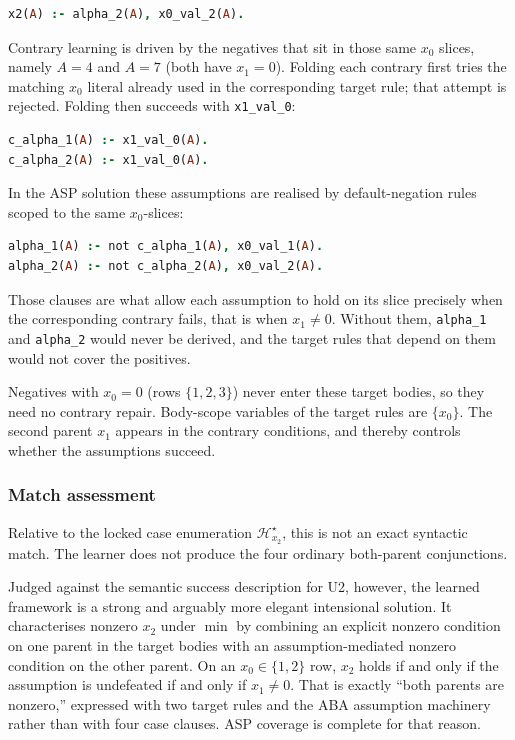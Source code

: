 \documentclass[11pt]{article}
\begin{document}
\begin{lstlisting}[style=logic,language=Prolog]
x2(A) :- alpha_2(A), x0_val_2(A).
\end{lstlisting}

Contrary learning is driven by the negatives that sit in those same \(x_0\) slices, namely \(A=4\) and \(A=7\) (both have \(x_1=0\)). Folding each contrary first tries the matching \(x_0\) literal already used in the corresponding target rule; that attempt is rejected. Folding then succeeds with \texttt{x1\_val\_0}:

\begin{lstlisting}[style=logic,language=Prolog]
c_alpha_1(A) :- x1_val_0(A).
c_alpha_2(A) :- x1_val_0(A).
\end{lstlisting}

In the ASP solution these assumptions are realised by default-negation rules scoped to the same \(x_0\)-slices:

\begin{lstlisting}[style=logic,language=Prolog]
alpha_1(A) :- not c_alpha_1(A), x0_val_1(A).
alpha_2(A) :- not c_alpha_2(A), x0_val_2(A).
\end{lstlisting}

Those clauses are what allow each assumption to hold on its slice precisely when the corresponding contrary fails, that is when \(x_1\neq 0\). Without them, \texttt{alpha\_1} and \texttt{alpha\_2} would never be derived, and the target rules that depend on them would not cover the positives.

Negatives with \(x_0=0\) (rows \(\{1,2,3\}\)) never enter these target bodies, so they need no contrary repair. Body-scope variables of the target rules are \(\{x_0\}\). The second parent \(x_1\) appears in the contrary conditions, and thereby controls whether the assumptions succeed.

\subsubsection{Match assessment}

Relative to the locked case enumeration \(\mathcal{H}_{x_2}^\star\), this is not an exact syntactic match. The learner does not produce the four ordinary both-parent conjunctions.

Judged against the semantic success description for U2, however, the learned framework is a strong and arguably more elegant intensional solution. It characterises nonzero \(x_2\) under \(\min\) by combining an explicit nonzero condition on one parent in the target bodies with an assumption-mediated nonzero condition on the other parent. On an \(x_0\in\{1,2\}\) row, \(x_2\) holds if and only if the assumption is undefeated if and only if \(x_1\neq 0\). That is exactly ``both parents are nonzero,'' expressed with two target rules and the ABA assumption machinery rather than with four case clauses. ASP coverage is complete for that reason.
\end{document}
